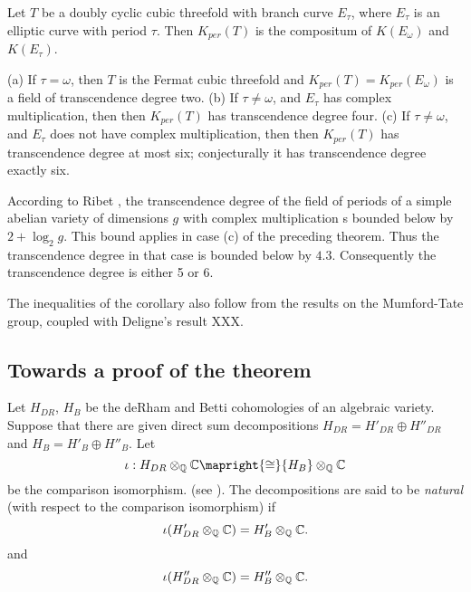 \begin{theorem} Let $T$ be a doubly cyclic cubic threefold with branch curve $E_\tau$,
where $E_\tau$ is an elliptic curve with period $\tau$. Then $K_{per}(T)$ is the
compositum of $K(E_\omega)$ and $K(E_\tau)$. \end{theorem}

\begin{corollary} (a) If $\tau = \omega$, then $T$ is the Fermat cubic threefold and
$K_{per}(T) = K_{per}(E_\omega)$ is a field of transcendence degree two. (b) If $\tau
\ne \omega$, and $E_\tau$ has complex multiplication, then then $K_{per}(T) $ has
transcendence degree four. (c) If $\tau \ne \omega$, and $E_\tau$ does not have complex
multiplication, then then $K_{per}(T) $ has transcendence degree at most six;
conjecturally it has transcendence degree exactly six. \end{corollary} 

\begin{remark} \rm {According to Ribet \cite{Ribet:DF}, the transcendence degree of the
field of periods of a simple abelian variety of dimensions $g$ with complex
multiplication s bounded below by $2 + \log_2 g$. This bound applies in case (c) of the
preceding theorem. Thus the transcendence degree in that case is bounded below by
$4.3$. Consequently the transcendence degree is either 5 or 6.}  \end{remark}

\noindent The inequalities of the corollary also follow from the results on the
Mumford-Tate group, coupled with Deligne's result XXX.

\subsection{Towards a proof of the theorem}

Let $H_{DR}$, $H_B$ be the deRham and Betti cohomologies of an algebraic variety.
Suppose that there are given direct sum decompositions $H_{DR} = H'_{DR} \oplus
H''_{DR}$ and $H_{B} = H'_{B} \oplus H''_{B}$. Let \[ \iota: {H_{DR}}\otimes_\QQ \CC
\mapright{\cong} {H_B}\otimes_\QQ \CC \] be the comparison isomorphism. (see
\cite{Deligne:HCA}). The decompositions are said to be \emph{natural} (with respect to
the comparison isomorphism) if \[ \iota( H'_{DR}\otimes_{ \mathbb Q } { \mathbb C } ) = H'_{B}\otimes_{ \mathbb Q }
{ \mathbb C } . \] and \[ \iota( H''_{DR}\otimes_{ \mathbb Q } { \mathbb C } ) = H''_{B}\otimes_{ \mathbb Q } { \mathbb C } . \]

